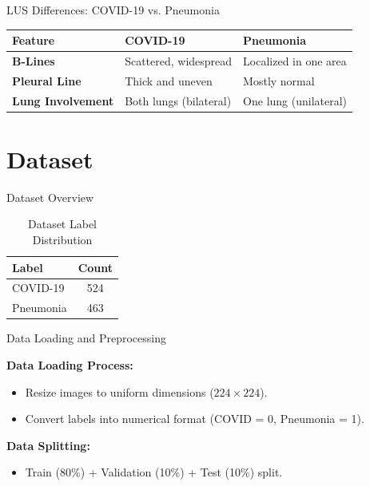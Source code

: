 \documentclass{beamer}
\begin{document}
\begin{frame}{LUS Differences: COVID-19 vs. Pneumonia}
    \centering
    \begin{tabular}{lll}
        \hline
        \textbf{Feature} & \textbf{COVID-19} & \textbf{Pneumonia} \\
        \hline
        \textbf{B-Lines} & Scattered, widespread & Localized in one area \\
        \hline
        \textbf{Pleural Line} & Thick and uneven & Mostly normal \\
        \hline
        \textbf{Lung Involvement} & Both lungs (bilateral) & One lung (unilateral) \\
        \hline
    \end{tabular}
    
    
\end{frame}

\section{Dataset}

\begin{frame}{Dataset Overview}
\begin{table}[]
        \centering
        \begin{tabular}{lc}
            \toprule
            \textbf{Label} & \textbf{Count} \\
            \midrule
            COVID-19 & 524 \\
            Pneumonia & 463 \\
            \bottomrule
        \end{tabular}
	\vspace{0.5cm}
        \caption{Dataset Label Distribution}
    \end{table}
\end{frame}

\begin{frame}{Data Loading and Preprocessing}

    \textbf{Data Loading Process:}
    \begin{itemize}
        \item Resize images to uniform dimensions (\(224 \times 224\)).
        \item Convert labels into numerical format (COVID = 0, Pneumonia = 1).
    \end{itemize}

    \textbf{Data Splitting:}
    \begin{itemize}
        \item Train (80\%) + Validation (10\%) + Test (10\%) split.
    \end{itemize}
\end{frame}
\end{document}
